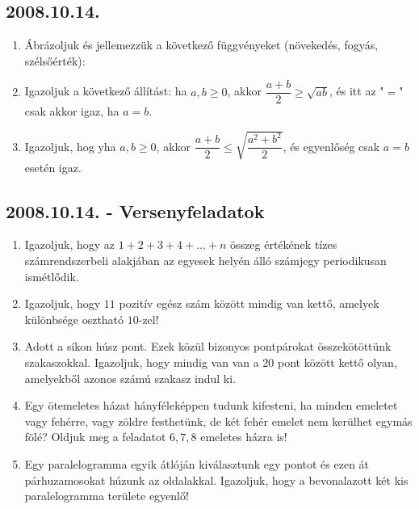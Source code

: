 \subsection*{2008.10.14.}
\begin{enumerate}
\item Ábrázoljuk és jellemezzük a következő függvényeket (növekedés, fogyás, szélsőérték): 
\item Igazoljuk a következő állítást: ha $a,b\geq0$, akkor $\dfrac{a+b}{2}\geq\sqrt{ab}$, és itt az "$=$" csak akkor igaz, ha $a=b$.
\item Igazoljuk, hog yha $a,b\geq0$, akkor $\dfrac{a+b}{2}\leq\sqrt{\dfrac{a^2+b^2}{2}}$, és egyenlőség csak $a=b$ esetén igaz.
\end{enumerate}

\subsection*{2008.10.14. - Versenyfeladatok}
\begin{enumerate}
\item Igazoljuk, hogy az $1+2+3+4+\ldots+n$ összeg értékének tízes számrendszerbeli alakjában az egyesek helyén álló számjegy periodikusan ismétlődik.
\item Igazoljuk, hogy $11$ pozitív egész szám között mindig van kettő, amelyek különbsége osztható $10$-zel!
\item Adott a síkon húsz pont. Ezek közül bizonyos pontpárokat összekötöttünk szakaszokkal. Igazoljuk, hogy mindig van van a $20$ pont között kettő olyan, amelyekből azonos számú szakasz indul ki.
\item Egy ötemeletes házat hányféleképpen tudunk kifesteni, ha minden emeletet vagy fehérre, vagy zöldre festhetünk, de két fehér emelet nem kerülhet egymás fölé? Oldjuk meg a feladatot $6,7,8$ emeletes házra is!
\item Egy paralelogramma egyik átlóján kiválasztunk egy pontot és ezen át párhuzamosokat húzunk az oldalakkal. Igazoljuk, hogy a bevonalazott két kis paralelogramma területe egyenlő! 
\end{enumerate}
